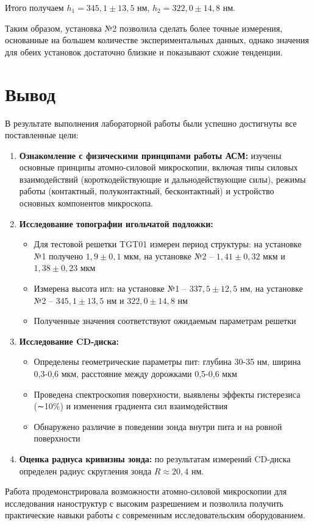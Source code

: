 \documentclass[a4paper,12pt]{article}
\begin{document}
Итого получаем $h_1 = 345,1 \pm 13,5$ нм, $h_2 = 322,0 \pm 14,8$ нм. 

Таким образом, установка №2 позволила сделать более точные измерения, основанные на большем количестве экспериментальных данных, однако значения для обеих установок достаточно близкие и показывают схожие тенденции.

\section{Вывод}

В результате выполнения лабораторной работы были успешно достигнуты все поставленные цели:

\begin{enumerate}
\item \textbf{Ознакомление с физическими принципами работы АСМ:} изучены основные принципы атомно-силовой микроскопии, включая типы силовых взаимодействий (короткодействующие и дальнодействующие силы), режимы работы (контактный, полуконтактный, бесконтактный) и устройство основных компонентов микроскопа.

\item \textbf{Исследование топографии игольчатой подложки:} 
\begin{itemize}
\item Для тестовой решетки TGT01 измерен период структуры: на установке №1 получено $1,9 \pm 0,1$ мкм, на установке №2 -- $1,41 \pm 0,32$ мкм и $1,38 \pm 0,23$ мкм
\item Измерена высота игл: на установке №1 -- $337,5 \pm 12,5$ нм, на установке №2 -- $345,1 \pm 13,5$ нм и $322,0 \pm 14,8$ нм
\item Полученные значения соответствуют ожидаемым параметрам решетки
\end{itemize}

\item \textbf{Исследование CD-диска:}
\begin{itemize}
\item Определены геометрические параметры пит: глубина 30-35 нм, ширина 0,3-0,6 мкм, расстояние между дорожками 0,5-0,6 мкм
\item Проведена спектроскопия поверхности, выявлены эффекты гистерезиса (∼10\%) и изменения градиента сил взаимодействия
\item Обнаружено различие в поведении зонда внутри пита и на ровной поверхности
\end{itemize}

\item \textbf{Оценка радиуса кривизны зонда:} по результатам измерений CD-диска определен радиус скругления зонда $R \approx 20,4$ нм.
\end{enumerate}

Работа продемонстрировала возможности атомно-силовой микроскопии для исследования наноструктур с высоким разрешением и позволила получить практические навыки работы с современным исследовательским оборудованием.
\end{document}
